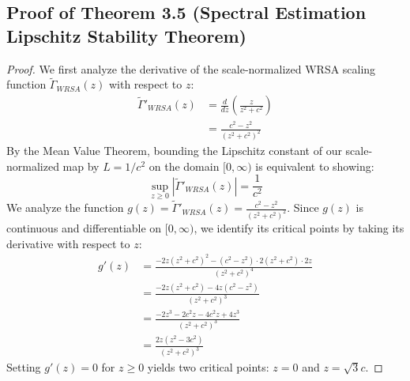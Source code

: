 \documentclass{article}
\theoremstyle{plain}
\theoremstyle{definition}
\theoremstyle{remark}
\begin{document}
\subsection{Proof of Theorem 3.5 (Spectral Estimation Lipschitz Stability Theorem)}
\label{app:proof_lipschitz_stability}
\begin{proof}
  We first analyze the derivative of the scale-normalized WRSA scaling function $\tilde{\Gamma}_{WRSA}(z)$ with respect to $z$:
  \begin{align}
    \tilde{\Gamma}'_{WRSA}(z) &= \frac{d}{dz}\left( \frac{z}{z^2 + c^2} \right) \nonumber \\
    &= \frac{c^2 - z^2}{(z^2 + c^2)^2}
  \end{align}
  By the Mean Value Theorem, bounding the Lipschitz constant of our scale-normalized map by $L = 1/c^2$ on the domain $[0, \infty)$ is equivalent to showing:
  \begin{equation}
    \sup_{z \ge 0} \left| \tilde{\Gamma}'_{WRSA}(z) \right| = \frac{1}{c^2}
  \end{equation}
  We analyze the function $g(z) = \tilde{\Gamma}'_{WRSA}(z) = \frac{c^2 - z^2}{(z^2 + c^2)^2}$.
  Since $g(z)$ is continuous and differentiable on $[0, \infty)$, we identify its critical points by taking its derivative with respect to $z$:
  \begin{align*}
    g'(z) &= \frac{-2z(z^2 + c^2)^2 - (c^2 - z^2) \cdot 2(z^2 + c^2) \cdot 2z}{(z^2 + c^2)^4} \\
    &= \frac{-2z(z^2 + c^2) - 4z(c^2 - z^2)}{(z^2 + c^2)^3} \\
    &= \frac{-2z^3 - 2c^2 z - 4c^2 z + 4z^3}{(z^2 + c^2)^3} \\
    &= \frac{2z(z^2 - 3c^2)}{(z^2 + c^2)^3}
  \end{align*}
  Setting $g'(z) = 0$ for $z \ge 0$ yields two critical points: $z = 0$ and $z = \sqrt{3}c$.
  

\end{proof}
\end{document}
